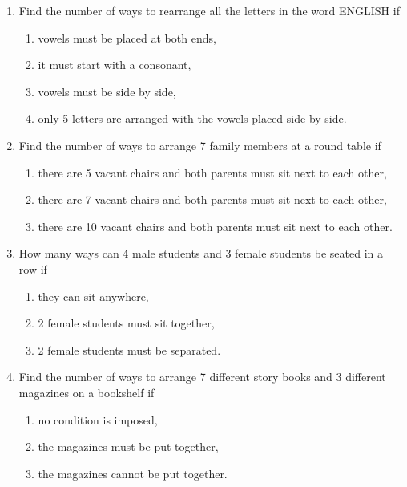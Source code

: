 \documentclass{report}
\begin{document}
\begin{multicols*}{2}
\begin{enumerate}
\begin{enumerate}
                        \item Find the number of ways to form a 5-digit number from cards that are labelled
                              with 1, 2, 2, 2, 3, 4, 5, 6, 7, 8, and 8 if all the digit 2 must be used.
                  \end{enumerate}

            \item Find the number of ways to rearrange all the letters in the word ENGLISH if
                  \begin{enumerate}
                        \item vowels must be placed at both ends,
                        \item it must start with a consonant,
                        \item vowels must be side by side,
                        \item only 5 letters are arranged with the vowels placed side by side.
                  \end{enumerate}

            \item Find the number of ways to arrange 7 family members at a round table if
                  \begin{enumerate}
                        \item there are 5 vacant chairs and both parents must sit next to each other,
                        \item there are 7 vacant chairs and both parents must sit next to each other,
                        \item there are 10 vacant chairs and both parents must sit next to each other.
                  \end{enumerate}

            \item How many ways can 4 male students and 3 female students be seated in a row if
                  \begin{enumerate}
                        \item they can sit anywhere,
                        \item 2 female students must sit together,
                        \item 2 female students must be separated.
                  \end{enumerate}

            \item Find the number of ways to arrange 7 different story books and 3 different
                  magazines on a bookshelf if
                  \begin{enumerate}
                        \item no condition is imposed,
                        \item the magazines must be put together,
                        \item the magazines cannot be put together.
                  \end{enumerate}


\end{enumerate}
\end{multicols*}
\end{document}
